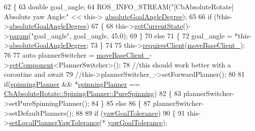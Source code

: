 \begin{DoxyCode}
62 \{
63     \textcolor{keywordtype}{double} goal\_angle;
64     ROS\_INFO\_STREAM(\textcolor{stringliteral}{"[CbAbsoluteRotate] Absolute yaw Angle:"} << this->
      \hyperlink{classcl__move__base__z_1_1CbAbsoluteRotate_ad5d0e21549940444e1cb525cda73329a}{absoluteGoalAngleDegree});
65 
66     \textcolor{keywordflow}{if} (!this->\hyperlink{classcl__move__base__z_1_1CbAbsoluteRotate_ad5d0e21549940444e1cb525cda73329a}{absoluteGoalAngleDegree})
67     \{
68         this->\hyperlink{classsmacc_1_1ISmaccClientBehavior_a34fde34e48fa13db622ee60d8374d0b8}{getCurrentState}()->\hyperlink{classsmacc_1_1ISmaccState_a4f2ff8e3eda8aa9bbb60c8ff17d0def1}{param}(\textcolor{stringliteral}{"goal\_angle"}, goal\_angle, 45.0);
69     \}
70     \textcolor{keywordflow}{else}
71     \{
72         goal\_angle = *this->\hyperlink{classcl__move__base__z_1_1CbAbsoluteRotate_ad5d0e21549940444e1cb525cda73329a}{absoluteGoalAngleDegree};
73     \}
74 
75     this->\hyperlink{classsmacc_1_1ISmaccClientBehavior_a32b16e99e3b4cb289414203dc861a440}{requiresClient}(\hyperlink{classcl__move__base__z_1_1CbAbsoluteRotate_a8ddbef73316ff96f30493b28b5627e35}{moveBaseClient\_});
76 
77     \textcolor{keyword}{auto} plannerSwitcher = \hyperlink{classcl__move__base__z_1_1CbAbsoluteRotate_a8ddbef73316ff96f30493b28b5627e35}{moveBaseClient\_}->\hyperlink{classsmacc_1_1ISmaccClient_adef78db601749ca63c19e74a27cb88cc}{getComponent}<PlannerSwitcher>();
78     \textcolor{comment}{//this should work better with a coroutine and await}
79     \textcolor{comment}{//this->plannerSwitcher\_->setForwardPlanner();}
80     
81     \textcolor{keywordflow}{if}(\hyperlink{classcl__move__base__z_1_1CbAbsoluteRotate_a17d836524599af072cf2e3488e491a91}{spinningPlanner} && *\hyperlink{classcl__move__base__z_1_1CbAbsoluteRotate_a17d836524599af072cf2e3488e491a91}{spinningPlanner} == 
      \hyperlink{classcl__move__base__z_1_1CbAbsoluteRotate_ab8d45e43594a3fc6a71c08f07b5dbef0aada5274435681a4ce04175bebfa6652f}{CbAbsoluteRotate::SpiningPlanner::PureSpinning})
82     \{
83         plannerSwitcher->setPureSpinningPlanner();
84     \}
85     \textcolor{keywordflow}{else}
86     \{
87         plannerSwitcher->setDefaultPlanners();
88 
89         \textcolor{keywordflow}{if} (\hyperlink{classcl__move__base__z_1_1CbAbsoluteRotate_a8d8b5b9c2c821efe101bb07c96c4bdd3}{yawGoalTolerance})
90         \{
91             this->\hyperlink{classcl__move__base__z_1_1CbAbsoluteRotate_aba8d93d615ccd43acd0684f8e88e2209}{setLocalPlannerYawTolerance}(*
      \hyperlink{classcl__move__base__z_1_1CbAbsoluteRotate_a8d8b5b9c2c821efe101bb07c96c4bdd3}{yawGoalTolerance});

\end{DoxyCode}
